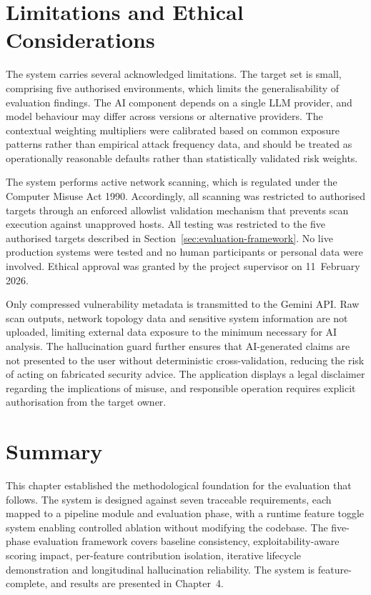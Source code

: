 \documentclass[12pt, a4paper, oneside]{report}
\begin{document}

\FloatBarrier

\section{Limitations and Ethical Considerations}
\label{sec:limitations-ethics}

The system carries several acknowledged limitations. The target set is small,
comprising five authorised environments, which limits the generalisability of
evaluation findings. The AI component depends on a single LLM provider, and
model behaviour may differ across versions or alternative providers. The
contextual weighting multipliers were calibrated based on common exposure
patterns rather than empirical attack frequency data, and should be treated as
operationally reasonable defaults rather than statistically validated risk
weights.

The system performs active network scanning, which is regulated under the
Computer Misuse Act 1990. Accordingly, all scanning was restricted to
authorised targets through an enforced allowlist validation mechanism that
prevents scan execution against unapproved hosts. All testing was restricted to
the five authorised targets described in Section~\ref{sec:evaluation-framework}.
No live production systems were tested and no human participants or personal
data were involved. Ethical approval was granted by the project supervisor on
11~February 2026.

Only compressed vulnerability metadata is transmitted to the Gemini API. Raw
scan outputs, network topology data and sensitive system information are not
uploaded, limiting external data exposure to the minimum necessary for AI
analysis. The hallucination guard further ensures that AI-generated claims are
not presented to the user without deterministic cross-validation, reducing the
risk of acting on fabricated security advice. The application displays a legal
disclaimer regarding the implications of misuse, and responsible operation
requires explicit authorisation from the target owner.

\section{Summary}
This chapter established the methodological foundation for the evaluation that follows. The system is designed against seven traceable requirements, each mapped to a pipeline module and evaluation phase, with a runtime feature toggle system enabling controlled ablation without modifying the codebase. The five-phase evaluation framework covers baseline consistency, exploitability-aware scoring impact, per-feature contribution isolation, iterative lifecycle demonstration and longitudinal hallucination reliability. The system is feature-complete, and results are presented in Chapter~4.
\end{document}
